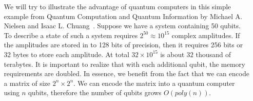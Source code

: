We will try to illustrate the advantage of quantum computers in this simple example from Quantum Computation and Quantum Information by Michael A. Nielsen and Isaac L. Chuang~\cite{qc}. Suppose we have a system containing 50 qubits. To describe a state of such a system requires $2^{50} \approx 10^{15}$ complex amplitudes. If the amplitudes are stored in to 128 bits of precision, then it requires 256 bits or 32 bytes to store each amplitude. At total $32 \times 10^{15}$ is about $32$ thousand of terabytes. It is important to realize that with each additional qubit, the memory requirements are doubled.
In essence, we benefit from the fact that we can encode a matrix of size $2^n \times 2^n$. We can encode the matrix into a quantum computer using $n$ qubits, therefore the number of qubits grows $O(poly(n))$.
